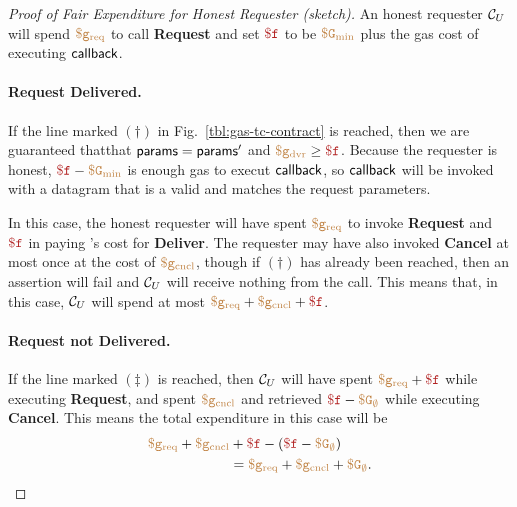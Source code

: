 \begin{proof}[Proof of Fair Expenditure for Honest Requester (sketch)]
An honest requester ${\cal C}_U$ will spend $\tt {\color{brown} \$g_\text{req} }$ to call {\bf Request}
and set $\fee$ to be $\tt {\color{brown} \$G_\text{min} }$ plus the gas cost of executing ${\sf callback}$.

\paragraph{Request Delivered.}
If the line marked $(\dagger)$ in Fig.~\ref{tbl:gas-tc-contract} is reached,
then we are guaranteed thatthat ${\sf params} = {\sf params}'$ and $\gasdeliver \geq \fee$.
Because the requester is honest, $\fee - \constgasmin$ is enough gas to execut ${\sf callback}$,
so ${\sf callback}$ will be invoked with a datagram that is a valid and matches the request parameters.

In this case, the honest requester will have spent $\tt {\color{brown} \$g_\text{req} }$ to invoke {\bf Request} and $\fee$ in paying \tc's cost for {\bf Deliver}.
The requester may have also invoked {\bf Cancel} at most once at the cost of $\tt {\color{brown} \$g_\text{cncl} }$,
though if $(\dagger)$ has already been reached, then an assertion will fail and ${\cal C}_U$ will receive nothing from the call.
This means that, in this case, ${\cal C}_U$ will spend at most $\gasrequest + \gascancel + \fee$.


\paragraph{Request not Delivered.}
If the line marked $(\ddagger)$ is reached, then ${\cal C}_U$ will have spent
$\gasrequest + \fee$ while executing {\bf Request},
and spent $\tt {\color{brown} \$g_\text{cncl} }$ and retrieved $\fee - \constgascancel$ while executing {\bf Cancel}.
This means the total expenditure in this case will be
\begin{align*}
  \gasrequest + \gascancel & + \fee - (\fee - \constgascancel) \\
                           & = \gasrequest + \gascancel + \constgascancel.
\end{align*}
\end{proof}

